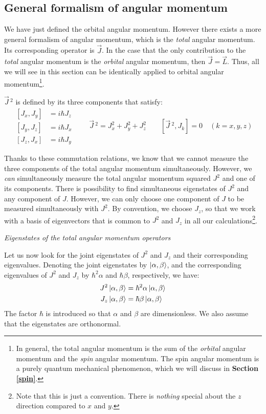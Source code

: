 \subsection{General formalism of angular momentum}

We have just defined the orbital angular momentum. However there exists a more general formalism of angular momentum, which is the \textit{total} angular momentum. Its corresponding operator is $\vec{J}$. In the case that the only contribution to the \textit{total} angular momentum is the \textit{orbital} angular momentum, then $\vec{J} = \vec{L}$. Thus, all we will see in this section can be identically applied to orbital angular momentum\footnote{In general, the total angular momentum is the sum of the \textit{orbital} angular momentum and the \textit{spin} angular momentum. The spin angular momentum is a purely quantum mechanical phenomenon, which we will discuss in \textbf{Section \ref{spin}}.}.

$\vec{J}\,^2$ is defined by its three components that satisfy:
\begin{equation} \label{eq:commutation_relations_angular_momentum}
    \begin{split}
        [J_x, J_y] &= i\hbar J_z \\
        [J_y, J_z] &= i\hbar J_x \\
        [J_z, J_x] &= i\hbar J_y
    \end{split}\qquad \vec{J}\,^2 = J_x^2 + J_y^2 + J_z^2\qquad [\vec{J}\,^2, J_k] = 0\quad (k = x, y, z)
\end{equation}

Thanks to these commutation relations, we know that we cannot measure the three components of the total angular momentum simultaneously. However, we \textit{can} simultaneously measure the total angular momentum squared $J^2$ and one of its components. There is possibility to find simultaneous eigenstates of $J^2$ and any component of $J$. However, we can only choose one component of $J$ to be measured simultaneously with $J^2$. By convention, we choose $J_z$, so that we work with a basis of eigenvectors that is common to $J^2$ and $J_z$ in all our calculations\footnote{Note that this is just a convention. There is \textit{nothing} special about the $z$ direction compared to $x$ and $y$.}.

\textit{Eigenstates of the total angular momentum operators}

Let us now look for the joint eigenstates of $J^2$ and $J_z$ and their corresponding eigenvalues. Denoting the joint eigenstates by $\ket{\alpha, \beta}$, and the corresponding eigenvalues of $J^2$ and $J_z$ by $\hbar^2\alpha$ and $\hbar \beta$, respectively, we have:
\begin{equation} \label{eq:angular_momentum_eigenstates}
    \begin{split}
        J^2\ket{\alpha, \beta} &= \hbar^2\alpha\ket{\alpha, \beta} \\
        J_z\ket{\alpha, \beta} &= \hbar\beta\ket{\alpha, \beta}
    \end{split}
\end{equation}
The factor $\hbar$ is introduced so that $\alpha$ and $\beta$ are dimensionless. We also assume that the eigenstates are orthonormal.

